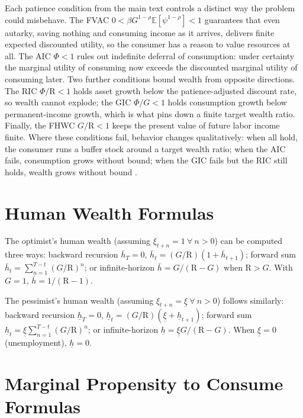 \documentclass[preprint,authoryear]{elsarticle}
\newcommand{\Ex}{\mathbf{\mathbb{E}}}
\newcommand{\DiscFac}{\beta}
\newcommand{\CRRA}{\rho}
\newcommand{\PermGroFac}{G}
\newcommand{\permShk}{\psi}
\newcommand{\AbsPatFac}{\Phi}
\newcommand{\Rfree}{\text{R}}
\newcommand{\tranShk}{\xi}
\newcommand{\hNrm}{h}
\newcommand{\hNrmOpt}{\bar{\hNrm}}
\newcommand{\tranShkMin}{\underline{\tranShk}}
\newcommand{\hNrmPes}{\underline{\hNrm}}
\begin{document}
Each patience condition from the main text controls a distinct way the problem could misbehave. The FVAC $0<\DiscFac\PermGroFac^{1 -\CRRA}\Ex[\permShk^{1 -\CRRA}]<1$ guarantees that even autarky, saving nothing and consuming income as it arrives, delivers finite expected discounted utility, so the consumer has a reason to value resources at all. The AIC $\AbsPatFac<1$ rules out indefinite deferral of consumption: under certainty the marginal utility of consuming now exceeds the discounted marginal utility of consuming later. Two further conditions bound wealth from opposite directions. The RIC $\AbsPatFac/\Rfree<1$ holds asset growth below the patience-adjusted discount rate, so wealth cannot explode; the GIC $\AbsPatFac/\PermGroFac<1$ holds consumption growth below permanent-income growth, which is what pins down a finite target wealth ratio. Finally, the FHWC $\PermGroFac/\Rfree<1$ keeps the present value of future labor income finite. Where these conditions fail, behavior changes qualitatively: when all hold, the consumer runs a buffer stock around a target wealth ratio; when the AIC fails, consumption grows without bound; when the GIC fails but the RIC still holds, wealth grows without bound \citep{Carroll1997, SolvingMicroDSOPs, CarrollShanker2024}.

\section{Human Wealth Formulas}

The optimist's human wealth (assuming $\tranShk_{t+n}=1~\forall~n>0$) can be computed three ways: backward recursion $\hNrmOpt_{T} = 0$, $\hNrmOpt_{t} = (\PermGroFac/\Rfree)(1 + \hNrmOpt_{t+1})$; forward sum $\hNrmOpt_{t} = \sum_{n=1}^{T -t}(\PermGroFac/\Rfree)^{n}$; or infinite-horizon $\hNrmOpt = \PermGroFac/(\Rfree -\PermGroFac)$ when $\Rfree>\PermGroFac$. With $\PermGroFac=1$, $\hNrmOpt = 1/(\Rfree -1)$.

The pessimist's human wealth (assuming $\tranShk_{t+n}=\tranShkMin~\forall~n>0$) follows similarly: backward recursion $\hNrmPes_{T}=0$, $\hNrmPes_{t}=(\PermGroFac/\Rfree)(\tranShkMin + \hNrmPes_{t+1})$; forward sum $\hNrmPes_{t}=\tranShkMin\sum_{n=1}^{T -t}(\PermGroFac/\Rfree)^{n}$; or infinite-horizon $\hNrmPes=\tranShkMin\PermGroFac/(\Rfree -\PermGroFac)$. When $\tranShkMin=0$ (unemployment), $\hNrmPes=0$.

\section{Marginal Propensity to Consume Formulas}
\end{document}
